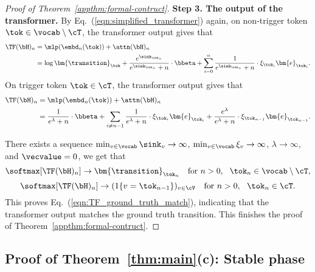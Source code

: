 \begin{proof}[Proof of Theorem~\ref{appthm:formal-contruct}]
\noindent
{\bf Step 3. The output of the transformer.} By Eq.~(\ref{eqn:simplified_transformer}) again, on non-trigger token $\tok\in\vocab\setminus \cT$, the transformer output gives that %
\begin{align*}
\TF(\bH)_n&=\mlp(\embd_n(\tok))+\attn(\bH)_n\\
&=\log \bm{\transition}_\tok + \frac{e^{\sink_{\tok_n}}}{e^{\sink_{\tok_n}} + n} \cdot \bbeta +  \sum_{i=0}^n \frac{1}{e^{\sink_{\tok_n}} + n} \cdot \xi_{\tok_i} \bm{e}_{\tok_i}.
\end{align*}
On trigger token $\tok\in\cT$, the transformer output gives that
\begin{align*}
\TF(\bH)_n&=\mlp(\embd_n(\tok))+\attn(\bH)_n\\
&=\frac{1}{e^\lambda + n} \cdot \bbeta +  \sum_{i\neq n-1} \frac{1}{e^\lambda + n} \cdot \xi_{\tok_i} \bm{e}_{\tok_i} + \frac{e^\lambda}{e^\lambda + n} \cdot \xi_{\tok_{n-1}} \bm{e}_{\tok_{n-1}}.
\end{align*}

There exists a sequence $\min_{v \in \vocab} \sink_v \to\infty$, $\min_{v \in \vocab} \xi_v \to\infty$, $\lambda\to \infty$, and $\vecvalue=0$, we get that
\begin{equation*}
\softmax[\TF(\bH)_n] \to \bm{\transition}_{\tok_n} ~~~\text{for }n>0,~~\tok_n\in\vocab \setminus \cT,
\end{equation*}
\begin{equation*}
\softmax[\TF(\bH)_n] \to ( 1\{ v = \tok_{n-1} \} )_{v \in \cV}~~~\text{for }n>0,~~\tok_n\in\cT.
\end{equation*}
This proves Eq.~(\ref{eqn:TF_ground_truth_match}), indicating that the transformer output matches the ground truth transition. This finishes the proof of Theorem~\ref{appthm:formal-contruct}. 
\end{proof}

\subsection{Proof of Theorem~\ref{thm:main}(c): Stable phase}\label{app:proof-main-3}




